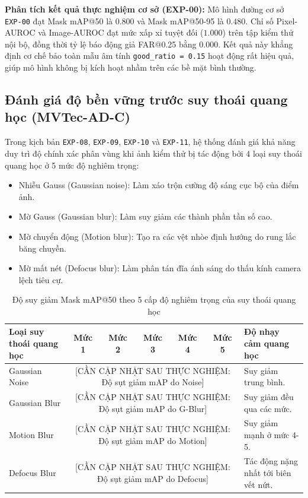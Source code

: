 \textbf{Phân tích kết quả thực nghiệm cơ sở (EXP-00):}
Mô hình đường cơ sở \texttt{EXP-00} đạt Mask mAP@50 là $0.800$ và Mask mAP@50-95 là $0.480$. Chỉ số Pixel-AUROC và Image-AUROC đạt mức xấp xỉ tuyệt đối ($1.000$) trên tập kiểm thử nội bộ, đồng thời tỷ lệ báo động giả FAR@0.25 bằng $0.000$. Kết quả này khẳng định cơ chế bảo toàn mẫu âm tính \texttt{good\_ratio = 0.15} hoạt động rất hiệu quả, giúp mô hình không bị kích hoạt nhầm trên các bề mặt bình thường.

\subsection{Đánh giá độ bền vững trước suy thoái quang học (MVTec-AD-C)}

Trong kịch bản \texttt{EXP-08}, \texttt{EXP-09}, \texttt{EXP-10} và \texttt{EXP-11}, hệ thống đánh giá khả năng duy trì độ chính xác phân vùng khi ảnh kiểm thử bị tác động bởi 4 loại suy thoái quang học ở 5 mức độ nghiêm trọng:
\begin{itemize}
    \item Nhiễu Gauss (Gaussian noise): Làm xáo trộn cường độ sáng cục bộ của điểm ảnh.
    \item Mờ Gauss (Gaussian blur): Làm suy giảm các thành phần tần số cao.
    \item Mờ chuyển động (Motion blur): Tạo ra các vệt nhòe định hướng do rung lắc băng chuyền.
    \item Mờ mất nét (Defocus blur): Làm phân tán đĩa ánh sáng do thấu kính camera lệch tiêu cự.
\end{itemize}

\begin{table}[h]
\centering
\caption{Độ suy giảm Mask mAP@50 theo 5 cấp độ nghiêm trọng của suy thoái quang học}
\label{tab:corruption_drop}
\begin{tabularx}{\textwidth}{l c c c c c X}
\toprule
\textbf{Loại suy thoái quang học} & \textbf{Mức 1} & \textbf{Mức 2} & \textbf{Mức 3} & \textbf{Mức 4} & \textbf{Mức 5} & \textbf{Độ nhạy cảm quang học} \\
\midrule
Gaussian Noise & \multicolumn{5}{c}{[CẦN CẬP NHẬT SAU THỰC NGHIỆM: Độ sụt giảm mAP do Noise]} & Suy giảm trung bình. \\
Gaussian Blur & \multicolumn{5}{c}{[CẦN CẬP NHẬT SAU THỰC NGHIỆM: Độ sụt giảm mAP do G-Blur]} & Suy giảm đều qua các mức. \\
Motion Blur & \multicolumn{5}{c}{[CẦN CẬP NHẬT SAU THỰC NGHIỆM: Độ sụt giảm mAP do Motion]} & Suy giảm mạnh ở mức 4-5. \\
Defocus Blur & \multicolumn{5}{c}{[CẦN CẬP NHẬT SAU THỰC NGHIỆM: Độ sụt giảm mAP do Defocus]} & Tác động nặng nhất tới biên vết nứt. \\
\bottomrule
\end{tabularx}
\end{table}

